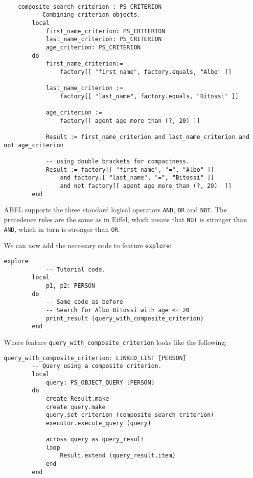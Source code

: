 \documentclass[a4paper,12pt]{report}
\begin{document}
\begin{lstlisting}[language=OOSC2Eiffel, captionpos=b, caption={Combining criteria.}, label={lst:search_albo_bitossi}]

	composite_search_criterion : PS_CRITERION
		-- Combining criterion objects.
		local
			first_name_criterion: PS_CRITERION
			last_name_criterion: PS_CRITERION
			age_criterion: PS_CRITERION
		do
			first_name_criterion:= 
				factory[[ "first_name", factory.equals, "Albo" ]]

			last_name_criterion := 
				factory[[ "last_name", factory.equals, "Bitossi" ]]

			age_criterion := 
				factory[[ agent age_more_than (?, 20) ]]
			
			Result := first_name_criterion and last_name_criterion and not age_criterion

			-- using double brackets for compactness. 
			Result := factory[[ "first_name", "=", "Albo" ]] 
				and factory[[ "last_name", "=", "Bitossi" ]] 
				and not factory[[ agent age_more_than (?, 20)  ]]
		end
\end{lstlisting}

ABEL supports the three standard logical operators \lstinline!AND!, \lstinline!OR! and \lstinline!NOT!. 
The precedence rules are the same as in Eiffel, which means that \lstinline!NOT! is stronger than \lstinline!AND!, which in turn is stronger than \lstinline!OR!.

We can now add the necessary code to feature \lstinline{explore}:  
\begin{lstlisting}[language=OOSC2Eiffel, captionpos=b, caption={Invoking the code that searches for Albo Bitossi}, label={lst:tutorial_print_result}]
	explore
			-- Tutorial code.
		local
			p1, p2: PERSON
		do
			-- Same code as before
			-- Search for Albo Bitossi with age <= 20
			print_result (query_with_composite_criterion)
		end
\end{lstlisting}

Where feature \lstinline{query_with_composite_criterion} looks like the following:
\begin{lstlisting}[language=OOSC2Eiffel, captionpos=b, caption={Invoking the code that searches for Albo Bitossi}, label={lst:tutorial_print_result}]
	query_with_composite_criterion: LINKED_LIST [PERSON]
		-- Query using a composite criterion.
		local
			query: PS_OBJECT_QUERY [PERSON]
		do
			create Result.make
			create query.make
			query.set_criterion (composite_search_criterion)
			executor.execute_query (query)

			across query as	query_result
			loop
				Result.extend (query_result.item)
			end
		end
\end{lstlisting}
\end{document}
